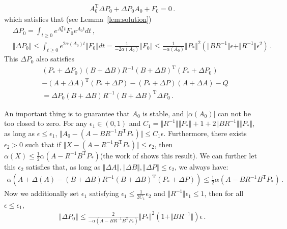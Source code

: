 \documentclass{article}
\theoremstyle{definition}
\begin{document}
\begin{align*}
A_{0}^{\mathrm{T}}\Delta P_{0}+\Delta P_{0} A_{0}+F_{0}=0\,.
\end{align*}
which satisfies that (see Lemma~\ref{lem:solution})
\begin{align*}
&\Delta P_{0}=\int_{t\geq 0}e^{A_{0}^{\mathrm{T}}t}F_{0}e^{A_{0}t}dt\,,\\ & \Vert \Delta P_{0}\Vert \leq \int_{t\geq 0}e^{2\alpha(A_{0})t}\Vert F_{0}\Vert dt=\frac{1}{-2\alpha(A_{0})}\Vert F_{0}\Vert \leq\frac{1}{-\alpha(A_{0})}\Vert P_{*}\Vert ^{2}(\Vert BR^{-1}\Vert \epsilon+\Vert R^{-1}\Vert \epsilon^{2})\,.
\end{align*}
This $\Delta P_{0}$ also satisfies
\begin{align*}
&(P_{*}+\Delta P_{0})(B+\Delta B)R^{-1}(B+\Delta B)^{\mathrm{T}}(P_{*}+\Delta P_{0})\\&-(A+\Delta A)^{\mathrm{T}}(P_{*}+\Delta P)-(P_{*}+\Delta P)(A+\Delta A)-Q\\&=\Delta P_{0}(B+\Delta B)R^{-1}(B+\Delta B)^{\mathrm{T}}\Delta P_{0}\,.
\end{align*}


An important thing is to guarantee that $A_{0}$ is stable, and $\vert\alpha(A_{0})\vert$ can not be too closed to zero.  
For any $\epsilon_{1}\in(0,1)$ and $C_{1}= \Vert R^{-1}\Vert \Vert P_{*}\Vert +1+2\Vert BR^{-1}\Vert \Vert P_{*}\Vert $, as long as $\epsilon\leq \epsilon_{1}$, $\Vert A_{0}-(A-BR^{-1}B^{\mathrm{T}}P_{*})\Vert \leq C_{1}\epsilon$. Furthermore, there exists $\epsilon_{2}>0$ such that if $\Vert X-(A-R^{-1}B^{\mathrm{T}}P_{*})\Vert \leq \epsilon_{2}$, then $\alpha(X)\leq\frac{1}{2}\alpha(A-R^{-1}B^{\mathrm{T}}P_{*})$(the work of \citep{ref1} shows this result). We can further let this $\epsilon_{2}$ satisfies that, as long as $\Vert \Delta A\Vert,\Vert \Delta B\Vert,\Vert \Delta P\Vert \leq \epsilon_{2}$, we always have:
\begin{align}\label{stable margin}
\alpha\left(A+\Delta(A)-(B+\Delta B)R^{-1}(B+\Delta B)^{\mathrm{T}}(P_{*}+\Delta P)\right)\leq \frac{1}{2}\alpha(A-BR^{-1}B^{\mathrm{T}}P_{*})\,.
\end{align}
Now we additionally set $\epsilon_{1}$ satisfying $\epsilon_{1}\leq \frac{1}{2C_{1}}\epsilon_{2}$ and $\Vert R^{-1}\Vert \epsilon_{1}\leq 1$, then for all $\epsilon\leq \epsilon_{1}$,
\begin{align*}
\left\Vert \Delta P_{0}\right\Vert \leq \frac{2}{-\alpha(A-BR^{-1}B^{\mathrm{T}}P_{*})}\Vert P_{*}\Vert ^{2}(1+\Vert BR^{-1}\Vert )\epsilon\,.
\end{align*}
\end{document}
